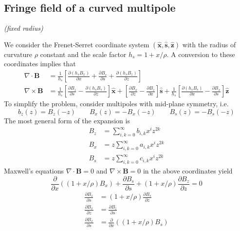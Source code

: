\subsection{Fringe field of a curved multipole}
	\textit{(fixed radius)}

We consider the Frenet-Serret coordinate system $ ( \hat{\mathbf{x}}, \hat{\mathbf{s}}, \hat{\mathbf{z}} )$ with the radius of curvature $ \rho $ constant and the scale factor $ h_s = 1 + x/ \rho$. A conversion to these coordinates implies that 
   \begin{align}
		\nabla \cdot \mathbf{B} & = \frac{1}{h_s} \left[ \frac{\partial (h_s B_x )}{\partial x} + \frac{\partial B_s}{\partial s} + \frac{\partial (h_s B_z )}{\partial z} \right] \\
		\nabla \times \mathbf{B} & = \frac{1}{h_s} \left[ \frac{\partial B_z}{\partial s} -  \frac{\partial (h_s B_s )}{\partial z} \right] \hat{\mathbf{x}} + \left[ \frac{\partial B_x}{\partial z} - \frac{\partial B_z}{\partial x} \right] \hat{\mathbf{s}} + \frac{1}{h_s} \left[ \frac{\partial (h_s B_s)}{\partial x} - \frac{\partial B_x}{\partial s} \right] \hat{\mathbf{z}} \nonumber
	\end{align}	
To simplify the problem, consider multipoles with mid-plane symmetry, i.e.
   \begin{equation}
		b_z (z) = B_z (-z) \qquad B_x (z) = - B_x (-z) \qquad B_s (z) = - B_s (-z)
	\end{equation}	
The most general form of the expansion is 
    \begin{align}
		 B_z & = \sum_{i,k=0}^{\infty} b_{i,k} x^i z^{2k} \label{eq:01} \\
		 B_x & = z \sum_{i,k=0}^{\infty} a_{i,k} x^i z^{2k} \label{eq:02}\\
		 B_s & = z \sum_{i,k=0}^{\infty} c_{i,k} x^i z^{2k} \label{eq:03}
	\end{align}	
Maxwell's equations $ \nabla \cdot \mathbf{B} = 0 $ and $ \nabla \times \mathbf{B} = 0 $ in the above coordinates yield 
	  \begin{equation}
		 \frac{\partial}{\partial x} \left( (1+x/ \rho) B_x \right) + \frac{\partial B_s}{\partial s} + (1+x/ \rho) \frac{\partial B_z}{\partial z} = 0 \label{eq:21} 
		\end{equation}
		\begin{align}
			\frac{\partial B_z}{\partial s} & = (1+x/ \rho) \frac{\partial B_s}{\partial z} \label{eq:22}  \\
			\frac{\partial B_x}{\partial z} & = \frac{\partial B_z}{\partial s} \label{eq:23}  \\
			 \frac{\partial B_x}{\partial s} & = \frac{\partial}{\partial x} \left( (1+x/ \rho) B_s \right) \label{eq:24}
		\end{align} 
